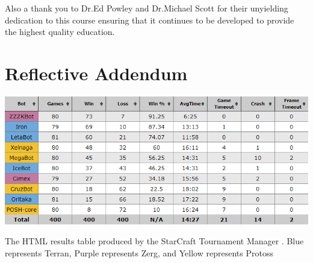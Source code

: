 \documentclass[journal]{IEEEtran}
\begin{document}
Also a thank you to Dr.Ed Powley and Dr.Michael Scott for their unyielding dedication to this course ensuring that it continues to be developed to provide the highest quality education.




\section{Reflective Addendum}

\appendix
\begin{table}[]
	\centering
	\includegraphics[width=\textwidth]{STMResultsWithBot}
	\caption{The HTML results table produced by the StarCraft Tournament Manager \cite{Tournament}. Blue represents Terran, Purple represents Zerg, and Yellow represents Protoss}
	\label{Table2}
\end{table}
\end{document}
